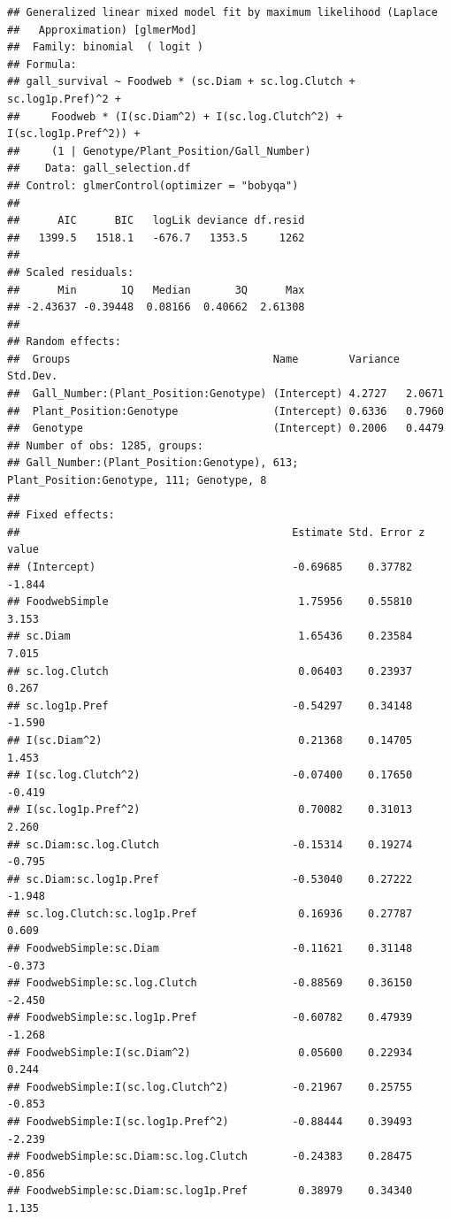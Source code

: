 \documentclass[]{elsarticle} %
\begin{document}
\begin{verbatim}
## Generalized linear mixed model fit by maximum likelihood (Laplace
##   Approximation) [glmerMod]
##  Family: binomial  ( logit )
## Formula: 
## gall_survival ~ Foodweb * (sc.Diam + sc.log.Clutch + sc.log1p.Pref)^2 +  
##     Foodweb * (I(sc.Diam^2) + I(sc.log.Clutch^2) + I(sc.log1p.Pref^2)) +  
##     (1 | Genotype/Plant_Position/Gall_Number)
##    Data: gall_selection.df
## Control: glmerControl(optimizer = "bobyqa")
## 
##      AIC      BIC   logLik deviance df.resid 
##   1399.5   1518.1   -676.7   1353.5     1262 
## 
## Scaled residuals: 
##      Min       1Q   Median       3Q      Max 
## -2.43637 -0.39448  0.08166  0.40662  2.61308 
## 
## Random effects:
##  Groups                                Name        Variance Std.Dev.
##  Gall_Number:(Plant_Position:Genotype) (Intercept) 4.2727   2.0671  
##  Plant_Position:Genotype               (Intercept) 0.6336   0.7960  
##  Genotype                              (Intercept) 0.2006   0.4479  
## Number of obs: 1285, groups:  
## Gall_Number:(Plant_Position:Genotype), 613; Plant_Position:Genotype, 111; Genotype, 8
## 
## Fixed effects:
##                                           Estimate Std. Error z value
## (Intercept)                               -0.69685    0.37782  -1.844
## FoodwebSimple                              1.75956    0.55810   3.153
## sc.Diam                                    1.65436    0.23584   7.015
## sc.log.Clutch                              0.06403    0.23937   0.267
## sc.log1p.Pref                             -0.54297    0.34148  -1.590
## I(sc.Diam^2)                               0.21368    0.14705   1.453
## I(sc.log.Clutch^2)                        -0.07400    0.17650  -0.419
## I(sc.log1p.Pref^2)                         0.70082    0.31013   2.260
## sc.Diam:sc.log.Clutch                     -0.15314    0.19274  -0.795
## sc.Diam:sc.log1p.Pref                     -0.53040    0.27222  -1.948
## sc.log.Clutch:sc.log1p.Pref                0.16936    0.27787   0.609
## FoodwebSimple:sc.Diam                     -0.11621    0.31148  -0.373
## FoodwebSimple:sc.log.Clutch               -0.88569    0.36150  -2.450
## FoodwebSimple:sc.log1p.Pref               -0.60782    0.47939  -1.268
## FoodwebSimple:I(sc.Diam^2)                 0.05600    0.22934   0.244
## FoodwebSimple:I(sc.log.Clutch^2)          -0.21967    0.25755  -0.853
## FoodwebSimple:I(sc.log1p.Pref^2)          -0.88444    0.39493  -2.239
## FoodwebSimple:sc.Diam:sc.log.Clutch       -0.24383    0.28475  -0.856
## FoodwebSimple:sc.Diam:sc.log1p.Pref        0.38979    0.34340   1.135

\end{verbatim}
\end{document}
